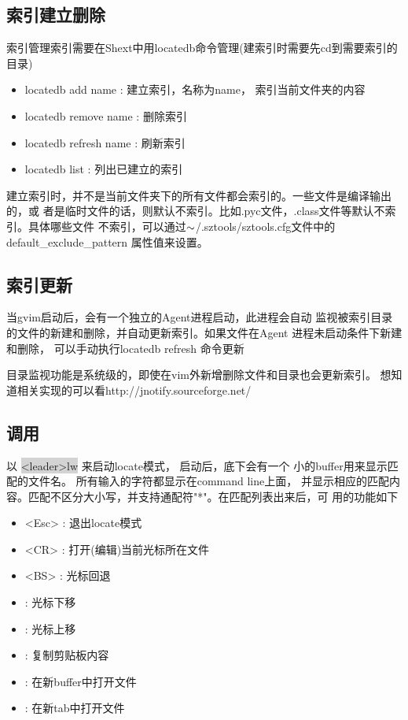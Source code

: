 \documentclass[oneside,openany]{book}
\begin{document}
\subsection{索引建立删除}
  索引管理索引需要在Shext中用locatedb命令管理(建索引时需要先cd到需要索引的目录) 
  \begin{itemize}
      \item locatedb add name : 建立索引，名称为name， 索引当前文件夹的内容
      \item locatedb remove name : 删除索引
      \item locatedb refresh name : 刷新索引
      \item locatedb list : 列出已建立的索引 
  \end{itemize}

  建立索引时，并不是当前文件夹下的所有文件都会索引的。一些文件是编译输出的，或
者是临时文件的话，则默认不索引。比如.pyc文件，.class文件等默认不索引。具体哪些文件
不索引，可以通过$\tiny{\sim}$/.sztools/sztools.cfg文件中的default\_exclude\_pattern
属性值来设置。

\subsection{索引更新}
    当gvim启动后，会有一个独立的Agent进程启动，此进程会自动
监视被索引目录的文件的新建和删除，并自动更新索引。如果文件在Agent
进程未启动条件下新建和删除， 可以手动执行locatedb refresh 命令更新

   目录监视功能是系统级的，即使在vim外新增删除文件和目录也会更新索引。
想知道相关实现的可以看http://jnotify.sourceforge.net/

\subsection{调用}
   以 \colorbox{lightgray}{<leader>lw} 来启动locate模式， 启动后，底下会有一个
小的buffer用来显示匹配的文件名。 所有输入的字符都显示在command line上面，
并显示相应的匹配内容。匹配不区分大小写，并支持通配符"*"。在匹配列表出来后，可
用的功能如下
    \begin{itemize}
        \item <Esc> : 退出locate模式
        \item <CR>  : 打开(编辑)当前光标所在文件 
        \item <BS>  : 光标回退
        \item <C-j> : 光标下移
        \item <C-k> : 光标上移
        \item <C-v> : 复制剪贴板内容
        \item <C-b> : 在新buffer中打开文件
        \item <C-t> : 在新tab中打开文件
    \end{itemize}
    
\end{document}
